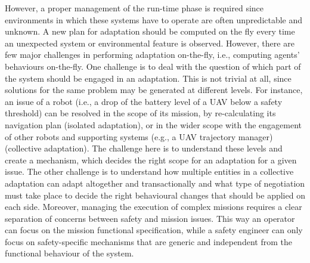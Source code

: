 \documentclass[journal]{IEEEtran}
\theoremstyle{definition}
\newcommand\patrizio[1]{\nb{Patrizio}{#1}}
\begin{document}
However, a proper management of the run-time phase is required since environments in which these systems have to
operate are often unpredictable and unknown. A new plan for adaptation should be computed on the fly every time an unexpected system or environmental
feature is observed. 
However, there are few major challenges in performing adaptation on-the-fly, i.e., computing agents' behaviours on-the-fly. One challenge is to deal with the question of which part of the system should be engaged in an adaptation. This is not trivial at all, since solutions for the same problem
may be generated at different levels. For instance, an issue of
a robot (i.e., a drop of the battery level of a UAV below a
safety threshold) can be resolved in the scope of its mission,
by re-calculating its navigation plan (isolated adaptation), or in the wider scope
with the engagement of other robots and supporting systems
(e.g., a UAV trajectory manager) (collective adaptation). The challenge here is to
understand these levels and create a mechanism, which decides the right scope for an adaptation for a given issue.
The other challenge is to understand how  multiple
entities in a collective adaptation can adapt altogether and transactionally and what type of negotiation must take place to decide the right behavioural changes that should be applied on each side.
Moreover, managing the execution of complex missions requires a clear separation of concerns between safety and mission issues. This  way an operator can focus on the mission functional specification, while a safety engineer can only focus on safety-specific mechanisms that are
generic and independent from the functional behaviour of the system. 




\end{document}
